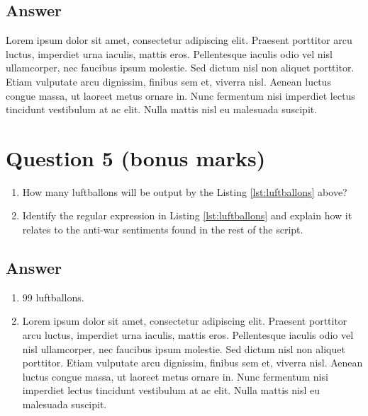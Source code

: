 \documentclass[
	12pt, %
]{../Template/fphw}
\begin{document}

\subsection*{Answer}

Lorem ipsum dolor sit amet, consectetur adipiscing elit. Praesent porttitor arcu luctus, imperdiet urna iaculis, mattis eros. Pellentesque iaculis odio vel nisl ullamcorper, nec faucibus ipsum molestie. Sed dictum nisl non aliquet porttitor. Etiam vulputate arcu dignissim, finibus sem et, viverra nisl. Aenean luctus congue massa, ut laoreet metus ornare in. Nunc fermentum nisi imperdiet lectus tincidunt vestibulum at ac elit. Nulla mattis nisl eu malesuada suscipit.


\section*{Question 5 (bonus marks)}

\begin{problem}
	
	
	\begin{enumerate}
		\item How many luftballons will be output by the Listing \ref{lst:luftballons} above?
		\item Identify the regular expression in Listing \ref{lst:luftballons} and explain how it relates to the anti-war sentiments found in the rest of the script.
	\end{enumerate}

\end{problem}


\subsection*{Answer}

\begin{enumerate}
	\item 99 luftballons.
	\item Lorem ipsum dolor sit amet, consectetur adipiscing elit. Praesent porttitor arcu luctus, imperdiet urna iaculis, mattis eros. Pellentesque iaculis odio vel nisl ullamcorper, nec faucibus ipsum molestie. Sed dictum nisl non aliquet porttitor. Etiam vulputate arcu dignissim, finibus sem et, viverra nisl. Aenean luctus congue massa, ut laoreet metus ornare in. Nunc fermentum nisi imperdiet lectus tincidunt vestibulum at ac elit. Nulla mattis nisl eu malesuada suscipit.
\end{enumerate}

\end{document}

